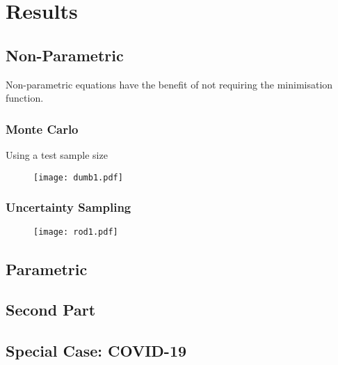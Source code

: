 \chapter{Results}


\graphicspath{{Chapter4/Figs/Vector/}{Chapter4/Figs/}}
\section{Non-Parametric}
Non-parametric equations have the benefit of not requiring the minimisation function.
\subsection{Monte Carlo}
Using a test sample size
\begin{figure}
    \begin{center}
        \texttt{[image: dumb1.pdf]}
        \caption[Batch Cluster Sampling]{}
    \end{center}
\end{figure}

\subsection{Uncertainty Sampling}
\begin{figure}
    \begin{center}
        \texttt{[image: rod1.pdf]}
        \caption[Batch Cluster Sampling]{}
    \end{center}
\end{figure}

\section{Parametric}
\blindtext[1]
\section{Second Part}
\blindtext[3]
\section{Special Case: COVID-19}